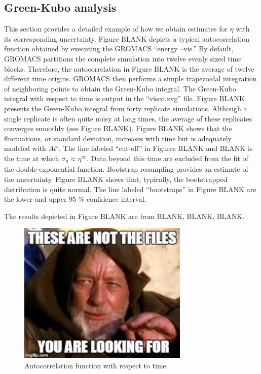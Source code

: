 \documentclass[preprint,review,12pt]{elsarticle}
\begin{document}
	\subsection{Green-Kubo analysis}
	
	This section provides a detailed example of how we obtain estimates for $\eta$ with its corresponding uncertainty. Figure BLANK depicts a typical autocorrelation function obtained by executing the GROMACS ``energy --vis.'' By default, GROMACS partitions the complete simulation into twelve evenly sized time blocks. Therefore, the autocorrelation in Figure BLANK is the average of twelve different time origins. GROMACS then performs a simple trapezoidal integration of neighboring points to obtain the Green-Kubo integral. The Green-Kubo integral with respect to time is output in the ``visco.xvg'' file. Figure BLANK presents the Green-Kubo integral from forty replicate simulations. Although a single replicate is often quite noisy at long times, the average of these replicates converges smoothly (see Figure BLANK). Figure BLANK shows that the fluctuations, or standard deviation, increases with time but is adequately modeled with $A t^{b}$. The line labeled ``cut-off'' in Figures BLANK and BLANK is the time at which $\sigma_{\eta} \approx \eta^\infty$. Data beyond this time are excluded from the fit of the double-exponential function. Bootstrap resampling provides an estimate of the uncertainty. Figure BLANK shows that, typically, the bootstrapped distribution is quite normal. The line labeled ``bootstraps'' in Figure BLANK are the lower and upper 95 \% confidence interval.

    The results depicted in Figure BLANK are from BLANK, BLANK, BLANK.
	
	\begin{figure}[htb!]
		\centering
		\includegraphics[width=3.2in]{empty_figure.jpg}
		\caption{Autocorrelation function with respect to time.}
		\label{fig:autocorrelation}
	\end{figure} 
\end{document}
